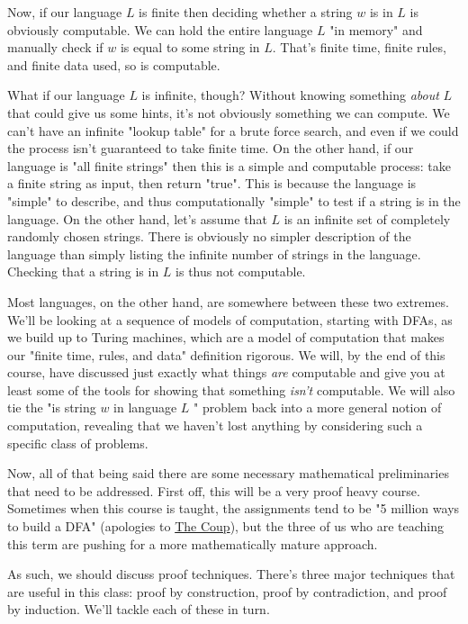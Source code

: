 \documentclass[11pt]{article}
\begin{document}
Now, if our language $L$ is finite then deciding whether a string $w$ is in $L$ is obviously computable. We can hold the entire language $L$ "in memory" and manually check if $w$ is equal to some string in $L$. That's finite time, finite rules, and finite data used, so is computable.

What if our language $L$ is infinite, though? Without knowing something \emph{about} $L$ that could give us some hints, it's not obviously something we can compute. We can't have an infinite "lookup table" for a brute force search, and even if we could the process isn't guaranteed to take finite time. On the other hand, if our language is "all finite strings" then this is a simple and computable process: take a finite string as input, then return "true". This is because the language is "simple" to describe, and thus computationally "simple" to test if a string is in the language. On the other hand, let's assume that $L$ is an infinite set of completely randomly chosen strings. There is obviously no simpler description of the language than simply listing the infinite number of strings in the language. Checking that a string is in $L$ is thus not computable.

Most languages, on the other hand, are somewhere between these two extremes. We'll be looking at a sequence of models of computation, starting with DFAs, as we build up to Turing machines, which are a model of computation that makes our "finite time, rules, and data" definition rigorous. We will, by the end of this course, have discussed just exactly what things \emph{are} computable and give you at least some of the tools for showing that something \emph{isn't} computable. We will also tie the "is string $w$ in language $L$ " problem back into a more general notion of computation, revealing that we haven't lost anything by considering such a specific class of problems.

Now, all of that being said there are some necessary mathematical preliminaries that need to be addressed. First off, this will be a very proof heavy course. Sometimes when this course is taught, the assignments tend to be "5 million ways to build a DFA" (apologies to \href{https://www.youtube.com/watch?v=RQthFDpYCys}{The Coup}), but the three of us who are teaching this term are pushing for a more mathematically mature approach. 

As such, we should discuss proof techniques. There's three major techniques that are useful in this class: proof by construction, proof by contradiction, and proof by induction. We'll tackle each of these in turn. 
\end{document}
